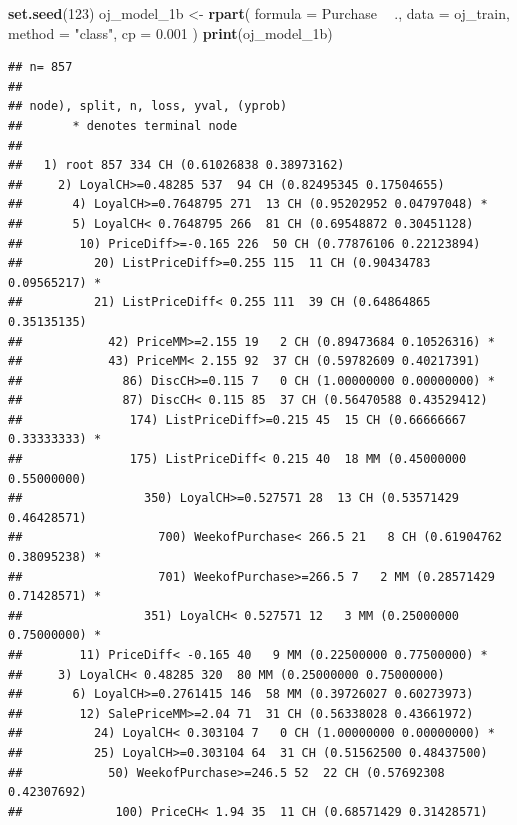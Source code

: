 \documentclass[
]{book}
\newenvironment{Shaded}{\begin{snugshade}}{\end{snugshade}}
\newcommand{\DataTypeTok}[1]{\textcolor[rgb]{0.13,0.29,0.53}{#1}}
\newcommand{\DecValTok}[1]{\textcolor[rgb]{0.00,0.00,0.81}{#1}}
\newcommand{\FloatTok}[1]{\textcolor[rgb]{0.00,0.00,0.81}{#1}}
\newcommand{\KeywordTok}[1]{\textcolor[rgb]{0.13,0.29,0.53}{\textbf{#1}}}
\newcommand{\NormalTok}[1]{#1}
\newcommand{\OperatorTok}[1]{\textcolor[rgb]{0.81,0.36,0.00}{\textbf{#1}}}
\newcommand{\StringTok}[1]{\textcolor[rgb]{0.31,0.60,0.02}{#1}}
\begin{document}
\begin{Shaded}
\begin{Highlighting}[]
\KeywordTok{set.seed}\NormalTok{(}\DecValTok{123}\NormalTok{)}
\NormalTok{oj_model_1b <-}\StringTok{ }\KeywordTok{rpart}\NormalTok{(}
   \DataTypeTok{formula =}\NormalTok{ Purchase }\OperatorTok{~}\StringTok{ }\NormalTok{.,}
   \DataTypeTok{data =}\NormalTok{ oj_train,}
   \DataTypeTok{method =} \StringTok{"class"}\NormalTok{,}
   \DataTypeTok{cp =} \FloatTok{0.001}
\NormalTok{   )}
\KeywordTok{print}\NormalTok{(oj_model_1b)}
\end{Highlighting}
\end{Shaded}

\begin{verbatim}
## n= 857 
## 
## node), split, n, loss, yval, (yprob)
##       * denotes terminal node
## 
##   1) root 857 334 CH (0.61026838 0.38973162)  
##     2) LoyalCH>=0.48285 537  94 CH (0.82495345 0.17504655)  
##       4) LoyalCH>=0.7648795 271  13 CH (0.95202952 0.04797048) *
##       5) LoyalCH< 0.7648795 266  81 CH (0.69548872 0.30451128)  
##        10) PriceDiff>=-0.165 226  50 CH (0.77876106 0.22123894)  
##          20) ListPriceDiff>=0.255 115  11 CH (0.90434783 0.09565217) *
##          21) ListPriceDiff< 0.255 111  39 CH (0.64864865 0.35135135)  
##            42) PriceMM>=2.155 19   2 CH (0.89473684 0.10526316) *
##            43) PriceMM< 2.155 92  37 CH (0.59782609 0.40217391)  
##              86) DiscCH>=0.115 7   0 CH (1.00000000 0.00000000) *
##              87) DiscCH< 0.115 85  37 CH (0.56470588 0.43529412)  
##               174) ListPriceDiff>=0.215 45  15 CH (0.66666667 0.33333333) *
##               175) ListPriceDiff< 0.215 40  18 MM (0.45000000 0.55000000)  
##                 350) LoyalCH>=0.527571 28  13 CH (0.53571429 0.46428571)  
##                   700) WeekofPurchase< 266.5 21   8 CH (0.61904762 0.38095238) *
##                   701) WeekofPurchase>=266.5 7   2 MM (0.28571429 0.71428571) *
##                 351) LoyalCH< 0.527571 12   3 MM (0.25000000 0.75000000) *
##        11) PriceDiff< -0.165 40   9 MM (0.22500000 0.77500000) *
##     3) LoyalCH< 0.48285 320  80 MM (0.25000000 0.75000000)  
##       6) LoyalCH>=0.2761415 146  58 MM (0.39726027 0.60273973)  
##        12) SalePriceMM>=2.04 71  31 CH (0.56338028 0.43661972)  
##          24) LoyalCH< 0.303104 7   0 CH (1.00000000 0.00000000) *
##          25) LoyalCH>=0.303104 64  31 CH (0.51562500 0.48437500)  
##            50) WeekofPurchase>=246.5 52  22 CH (0.57692308 0.42307692)  
##             100) PriceCH< 1.94 35  11 CH (0.68571429 0.31428571)  

\end{verbatim}
\end{document}
